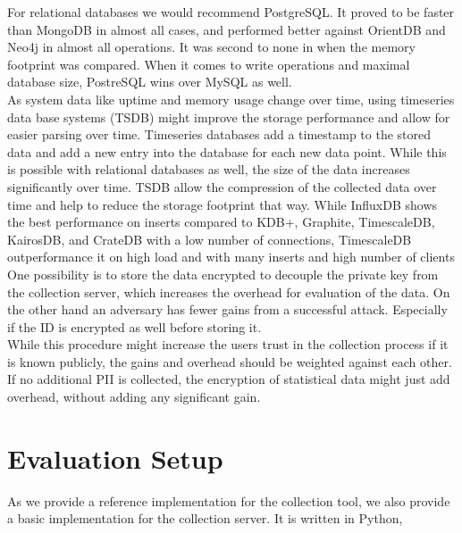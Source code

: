 For relational databases we would recommend PostgreSQL\cite{group_postgresql_2021}. It proved to be faster than MongoDB\cite{makris_mongodb_2020} in almost all cases, and performed better against OrientDB and Neo4j in almost all operations\cite{noauthor_benchmark_2018}. It was second to none in \cite{noauthor_benchmark_2018} when the memory footprint was compared.
When it comes to write operations and maximal database size, PostreSQL wins over MySQL as well\cite{noauthor_mysql_2021}.\\
As system data like uptime and memory usage change over time, using timeseries data base systems (TSDB) might improve the storage performance and allow for easier parsing over time. Timeseries databases add a timestamp to the stored data and add a new entry into the database for each new data point. While this is possible with relational databases as well, the size of the data increases significantly over time. TSDB allow the compression of the collected data over time and help to reduce the storage footprint that way. While InfluxDB shows the best performance on inserts  compared to KDB+\cite{}, Graphite\cite{}, TimescaleDB\cite{}, KairosDB\cite{}, and CrateDB\cite{} with a low number of connections\cite{}, TimescaleDB outperformance it on high load and with many inserts and high number of clients\cite{}
One possibility is to store the data encrypted to decouple the private key from the collection server, which increases the overhead for evaluation of the data. On the other hand an adversary has fewer gains from a successful attack. Especially if the ID is encrypted as well before storing it.\\
While this procedure might increase the users trust in the collection process if it is known publicly, the gains and overhead should be weighted against each other. If no additional PII is collected, the encryption of statistical data might just add overhead, without adding any significant gain.
%

\section{Evaluation Setup}
\label{sec:measurement:eval_setup}
%
As we provide a reference implementation for the collection tool, we also provide a basic implementation for the collection server\cite{}. It is written in Python,

